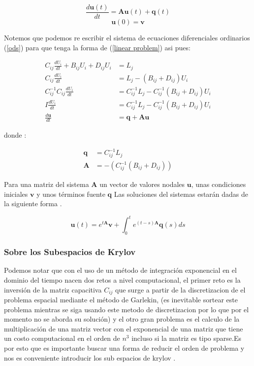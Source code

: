 \documentclass[11pt, spanish]{article}
\begin{document}
	

\begin{equation}
	\frac{d \mathbf{u}(t)}{dt} = \mathbf{A} \mathbf{u}(t) + \mathbf{q}(t)
	\label{linear problem}
\end{equation}
\begin{equation}
	\mathbf{u}(0) = \mathbf{v}
	\label{initial condition}
\end{equation}

Notemos que podemos re escribir el sistema de ecuaciones diferenciales ordinarios (\ref{ods}) para que tenga la forma de (\ref{linear problem}) asi pues:

\begin{align}
    C_{ij} \frac{d U_i}{dt} + B_{ij} U_i + D_{ij} U_i  &=L_j \\
    C_{ij} \frac{d U_i}{dt} &= L_j -(B_{ij}+D_{ij}) U_i \\
    C_{ij}^{-1}C_{ij} \frac{d U_i}{dt} &=C_{ij}^{-1} L_j - C_{ij}^{-1}(B_{ij}+D_{ij}) U_i \\
    I \frac{d U_i}{dt} &= C_{ij}^{-1} L_j - C_{ij}^{-1}(B_{ij}+D_{ij}) U_i\\
    \frac{d \textbf{u}}{dt} &= \textbf{q} + \textbf{A} \textbf{u}
\end{align}

donde : 

\begin{align}
    \textbf{q} &= C_{ij}^{-1} L_j \\
    \textbf{A} &= -(C_{ij}^{-1}(B_{ij}+D_{ij}))
\end{align}

Para una matriz del sistema $\mathbf{A}$ un vector de valores nodales $\mathbf{u}$,  unas condiciones iniciales $\mathbf{v}$ y unos t\'erminos fuente $\mathbf{q}$ Las soluciones del sistemas estar\'an dadas de la siguiente forma \cite{Schulze}.

\begin{equation}
	\mathbf{u}(t) = e ^{t \mathbf{A}} \mathbf{v} + \int_0 ^t e^{(t-s)\mathbf{A}} \mathbf{q}(s) ds
 \label{expint}
\end{equation}


\subsubsection{Sobre los Subespacios de Krylov}

Podemos notar que con el uso de un m\'etodo de  integraci\'on exponencial en el dominio del tiempo nacen dos retos a nivel computacional, el primer reto es la inversi\'on de la matriz capacitiva $C_{ij}$ que surge a partir de la discretizacion de el problema espacial mediante el m\'etodo de Garlekin, (es inevitable sortear este problema mientras se siga usando este metodo de discretizacion por lo que por el momento no se aborda su soluci\'on) y el otro gran problema es el calculo de la multiplicaci\'on de una matriz vector con el exponencial  de una matriz que tiene un costo computacional en el orden de $n^3$ incluso si la matriz es tipo sparse.Es por esto que es importante buscar una forma de reducir el orden de problema y nos es conveniente introducir los sub espacios de krylov . 
\end{document}

